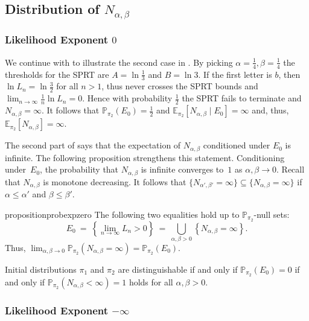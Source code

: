 \documentclass[a4paper,UKenglish,cleveref, autoref,mathscr]{lipics-v2019}
\newcommand{\EE}{\mathbb{E}}
\newcommand{\PP}{\mathbb{P}}
\newcommand{\1}{\mathbbm{1}}
\newcommand{\liexp}{\lim_{n\rightarrow\infty} \frac1n \ln L_n}
\begin{document}
\subsection{Distribution of $N_{\alpha, \beta}$}
\subsubsection{Likelihood Exponent $0$}
\begin{example}
We continue with  to illustrate the second case in .
By picking $\alpha = \frac14, \beta = \frac14$ the thresholds for the SPRT are $A = \ln \frac13$ and $B = \ln 3$.
If the first letter is $b$, then $\ln L_n = \ln \frac32$ for all $n > 1$, thus never crosses the SPRT bounds and $\liexp = 0$.
Hence with probability $\frac12$ the SPRT fails to terminate  and $N_{\alpha, \beta} = \infty$.
It follows that $\PP_{\pi_2}(E_0) = \frac12$ and $\EE_{\pi_2}[N_{\alpha, \beta} \mid E_0] = \infty$ and, thus, $\EE_{\pi_2}[N_{\alpha, \beta}] = \infty$.
\end{example}
The second part of  says that the expectation of $N_{\alpha, \beta}$ conditioned under $E_0$ is infinite.
The following proposition strengthens this statement.
Conditioning under~$E_0$, the probability that $N_{\alpha, \beta}$ is infinite converges to~$1$ as $\alpha, \beta \rightarrow 0$.
Recall that $N_{\alpha, \beta}$ is monotone decreasing.
It follows that $\{ N_{\alpha', \beta'} = \infty \} \subseteq \{ N_{\alpha, \beta} = \infty \}$ if $\alpha \leq \alpha'$ and $\beta \leq \beta'$.
\begin{restatable}{proposition}{probexpzero}\label{probexp0}
The following two equalities hold up to $\PP_{\pi_2}$-null sets:
\begin{equation*}
E_0 ~=~ \left\{\lim_{n \rightarrow \infty} L_n > 0 \right\} ~=~ \bigcup_{\alpha, \beta > 0} \left\{N_{\alpha, \beta} = \infty\right\}.
\end{equation*}
Thus, $\lim_{\alpha, \beta \rightarrow 0} \PP_{\pi_2}(N_{\alpha, \beta} = \infty) = \PP_{\pi_2}(E_0)$.
\end{restatable}
\begin{corollary} \label{cor:probexp0}
Initial distributions $\pi_1$ and $\pi_2$ are distinguishable if and only if $\PP_{\pi_2}(E_0) = 0$ if and only if $\PP_{\pi_2}(N_{\alpha, \beta} < \infty) = 1$ holds for all $\alpha, \beta > 0$.
\end{corollary}

\subsubsection{Likelihood Exponent $-\infty$}
\end{document}
